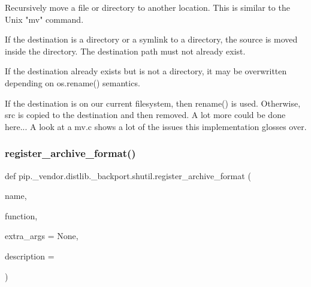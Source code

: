 \begin{DoxyVerb}Recursively move a file or directory to another location. This is
similar to the Unix "mv" command.

If the destination is a directory or a symlink to a directory, the source
is moved inside the directory. The destination path must not already
exist.

If the destination already exists but is not a directory, it may be
overwritten depending on os.rename() semantics.

If the destination is on our current filesystem, then rename() is used.
Otherwise, src is copied to the destination and then removed.
A lot more could be done here...  A look at a mv.c shows a lot of
the issues this implementation glosses over.\end{DoxyVerb}
 \mbox{\label{namespacepip_1_1__vendor_1_1distlib_1_1__backport_1_1shutil_af17d1c85c6b94b9e07f123dd667d5edb}} 
\subsubsection{\texorpdfstring{register\+\_\+archive\+\_\+format()}{register\_archive\_format()}}
{\footnotesize\ttfamily def pip.\+\_\+vendor.\+distlib.\+\_\+backport.\+shutil.\+register\+\_\+archive\+\_\+format (\begin{DoxyParamCaption}\item[{}]{name,  }\item[{}]{function,  }\item[{}]{extra\+\_\+args = {\ttfamily None},  }\item[{}]{description = {\ttfamily \textquotesingle{}\textquotesingle{}} }\end{DoxyParamCaption})}

